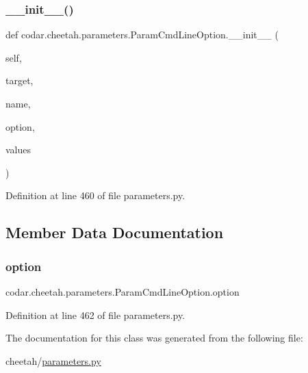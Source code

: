 \subsubsection{\texorpdfstring{\+\_\+\+\_\+init\+\_\+\+\_\+()}{\_\_init\_\_()}}
{\footnotesize\ttfamily def codar.\+cheetah.\+parameters.\+Param\+Cmd\+Line\+Option.\+\_\+\+\_\+init\+\_\+\+\_\+ (\begin{DoxyParamCaption}\item[{}]{self,  }\item[{}]{target,  }\item[{}]{name,  }\item[{}]{option,  }\item[{}]{values }\end{DoxyParamCaption})}



Definition at line 460 of file parameters.\+py.



\subsection{Member Data Documentation}
\mbox{\label{classcodar_1_1cheetah_1_1parameters_1_1_param_cmd_line_option_a75dae9b35fe11bc6833cfa0777185e20}} 
\subsubsection{\texorpdfstring{option}{option}}
{\footnotesize\ttfamily codar.\+cheetah.\+parameters.\+Param\+Cmd\+Line\+Option.\+option}



Definition at line 462 of file parameters.\+py.



The documentation for this class was generated from the following file\+:\begin{DoxyCompactItemize}
\item 
cheetah/\hyperlink{parameters_8py}{parameters.\+py}\end{DoxyCompactItemize}
